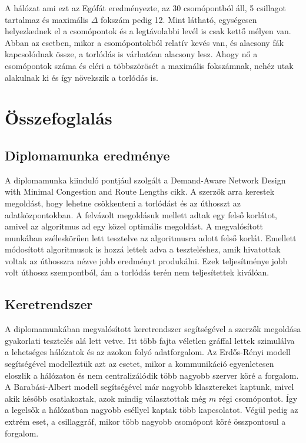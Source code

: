 \documentclass[12pt]{report}
\begin{document}
A hálózat ami ezt az Egófát eredményezte, az 30 csomópontból áll, 5 csillagot tartalmaz és maximális $\Delta$ fokszám pedig 12. 
Mint látható, egységesen helyezkednek el a csomópontok és a legtávolabbi levél is csak kettő mélyen van.
Abban az esetben, mikor a csomópontokból relatív kevés van, és alacsony fák kapcsolódnak össze, a torlódás is várhatóan alacsony lesz. 
Ahogy nő a csomópontok száma és eléri a többszörösét a maximális fokszámnak, nehéz utak alakulnak ki és így növekszik a torlódás is.

\chapter{Összefoglalás}

\section{Diplomamunka eredménye}

A diplomamunka kiinduló pontjául szolgált a Demand-Aware Network Design with Minimal Congestion and Route Lengths \cite{avin_demand-aware_nodate} cikk.
A szerzők arra kerestek megoldást, hogy lehetne csökkenteni a torlódást és az úthosszt az adatközpontokban.
A felvázolt megoldásuk mellett adtak egy felső korlátot, amivel az algoritmus ad egy közel optimális megoldást.
A megvalósított munkában széleskörűen lett tesztelve az algoritmusra adott felső korlát.
Emellett módosított algoritmusok is hozzá lettek adva a teszteléshez, amik hivatottak voltak az úthosszra nézve jobb eredményt produkálni.
Ezek teljesítménye jobb volt úthossz szempontból, ám a torlódás terén nem teljesítettek kiválóan.


\section{Keretrendszer}

A diplomamunkában megvalósított keretrendszer segítségével a szerzők megoldása gyakorlati tesztelés alá lett vetve.
Itt több fajta véletlen gráffal lettek szimulálva a lehetséges hálózatok és az azokon folyó adatforgalom.
Az Erdős-Rényi modell segítségével modelleztük azt az esetet, mikor a kommunikáció egyenletesen eloszlik a hálózaton és nem centralizálódik több nagyobb szerver köré a forgalom.
A Barabási-Albert modell segítségével már nagyobb klasztereket kaptunk, mivel akik később csatlakoztak, azok mindig választottak még $m$ régi csomópontot.
Így a legelsők a hálózatban nagyobb eséllyel kaptak több kapcsolatot.
Végül pedig az extrém eset, a csillaggráf, mikor több nagyobb csomópont köré összpontosul a forgalom.
\end{document}
